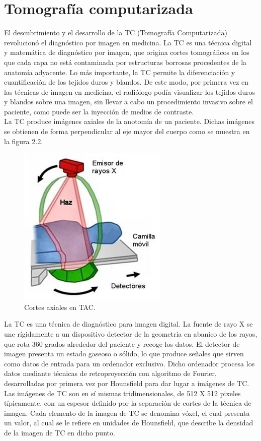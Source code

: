 \documentclass[12pt]{report}
\begin{document}
\section{Tomografía computarizada}
El descubrimiento y el desarrollo de la TC (Tomografía Computarizada) revolucionó el diagnóstico por imagen en medicina. La TC es una técnica digital y matemática de diagnóstico por imagen, que origina cortes tomográficos en los que cada capa no está contaminada por estructuras borrosas procedentes de la anatomía adyacente. Lo más importante, la TC permite la diferenciación y cuantificación de los tejidos duros y blandos. De este modo, por primera vez en las técnicas de imagen en medicina, el radiólogo podía visualizar los tejidos duros y blandos sobre una imagen, sin llevar a cabo un procedimiento invasivo sobre el paciente, como puede ser la inyección de medios de contraste.\\
La TC produce imágenes axiales de la anotomía de un paciente. Dichas imágenes se obtienen de forma perpendicular al eje mayor del cuerpo como se muestra en la figura 2.2.

\begin{figure}[H]
\centering
\includegraphics[width = 5 cm, height = 5 cm]{tac}
\caption{Cortes axiales en TAC.}
\end{figure}

La TC es una técnica de diagnóstico para imagen digital. La fuente de rayo X se une rígidamente a un dispositivo detector de la geometría en abanico de los rayos, que rota 360 grados alrededor del paciente y recoge los datos. El detector de imagen presenta un estado gaseoso o sólido, lo que produce señales que sirven como datos de entrada para un ordenador exclusivo. Dicho ordenador procesa los datos mediante técnicas de retroproyección con algoritmo de Fourier, desarrolladas por primera vez por Hounsfield para dar lugar a imágenes de TC. Las imágenes de TC son en sí mismas tridimensionales, de 512 X 512 pixeles típicamente, con un espesor definido por la separación de cortes de la técnica de imagen. Cada elemento de la imagen de TC se denomina vóxel, el cual presenta un valor, al cual se le refiere en unidades de Hounsfield, que describe la densidad de la imagen de TC en dicho punto.\cite{prote}\\
 
\end{document}
